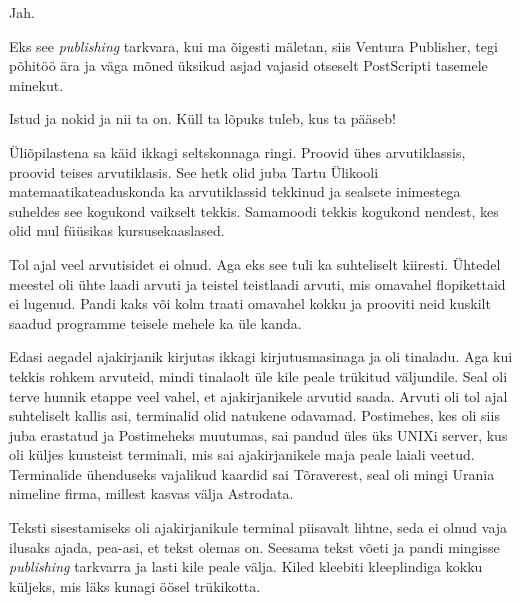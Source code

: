 Jah.


Eks see  \emph{publishing} tarkvara, kui ma õigesti mäletan, siis Ventura 
Publisher, tegi põhitöö ära ja väga mõned üksikud asjad vajasid otseselt 
PostScripti tasemele minekut. 


Istud ja nokid ja nii ta on. Küll ta lõpuks tuleb, kus ta pääseb!


Üliõpilastena sa käid ikkagi seltskonnaga ringi. Proovid ühes arvutiklassis, 
proovid teises arvutiklasis. See hetk olid juba Tartu Ülikooli 
matemaatikateaduskonda ka 
arvutiklassid tekkinud ja  sealsete inimestega suheldes  see  kogukond vaikselt 
tekkis. Samamoodi tekkis kogukond nendest, kes olid mul füüsikas 
kursusekaaslased.


Tol ajal veel arvutisidet ei olnud. Aga eks see tuli ka suhteliselt kiiresti. 
Ühtedel meestel  oli ühte laadi arvuti ja teistel teistlaadi arvuti, mis 
omavahel flopikettaid ei lugenud. Pandi kaks või kolm traati omavahel kokku ja 
prooviti neid kuskilt saadud programme teisele mehele ka üle kanda.


Edasi aegadel ajakirjanik kirjutas ikkagi kirjutusmasinaga ja oli 
tinaladu. Aga kui tekkis rohkem arvuteid,  mindi tinalaolt üle kile peale 
trükitud väljundile. Seal oli terve hunnik etappe veel vahel, et ajakirjanikele 
arvutid saada. Arvuti oli tol ajal suhteliselt kallis asi, terminalid olid 
natukene odavamad. Postimehes, kes oli siis juba erastatud ja 
Postimeheks muutumas, sai pandud üles üks UNIXi server, kus oli küljes 
kuusteist terminali, mis sai ajakirjanikele maja peale laiali veetud. 
Terminalide ühenduseks vajalikud kaardid sai Tõraverest, seal oli mingi 
Urania nimeline firma, millest kasvas välja 
Astrodata.

Teksti sisestamiseks oli ajakirjanikule terminal piisavalt lihtne, seda ei 
olnud vaja ilusaks ajada, pea-asi, et tekst olemas on. Seesama tekst võeti ja 
pandi mingisse \emph{publishing} tarkvarra ja lasti kile peale välja. Kiled 
kleebiti kleeplindiga kokku küljeks, mis läks  kunagi öösel trükikotta. 

